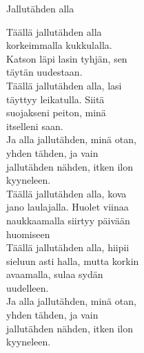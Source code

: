 \begin{song}{Jallutähden alla}

    Täällä jallutähden alla\\
    korkeimmalla kukkulalla.\\
    Katson läpi lasin tyhjän, sen\\
    täytän uudestaan.\\

    Täällä jallutähden alla, lasi\\
    täyttyy leikatulla. Siitä\\
    suojakseni peiton, minä\\
    itselleni saan.\\

    Ja alla jallutähden, minä otan,\\
    yhden tähden, ja vain\\
    jallutähden nähden, itken ilon\\
    kyyneleen.\\

    Täällä jallutähden alla, kova\\
    jano laulajalla. Huolet viinaa\\
    naukkaamalla siirtyy päivään\\
    huomiseen\\

    Täällä jallutähden alla, hiipii\\
    sieluun asti halla, mutta korkin\\
    avaamalla, sulaa sydän\\
    uudelleen.\\

    Ja alla jallutähden, minä otan,\\
    yhden tähden, ja vain\\
    jallutähden nähden, itken ilon\\
    kyyneleen.

\end{song}